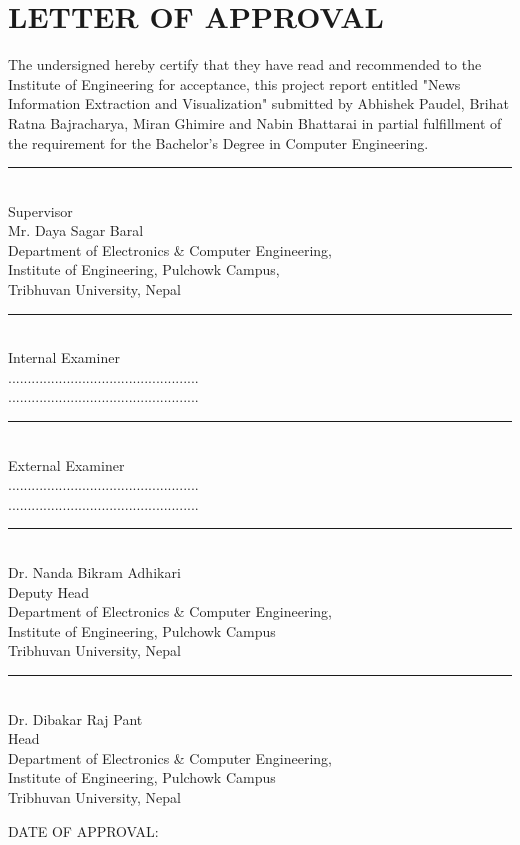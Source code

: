 
\newpage
\section*{LETTER OF APPROVAL}
\setcounter{page}{2}
The undersigned hereby certify that they have read and recommended to the Institute of Engineering for acceptance, this project
report entitled "News Information Extraction and Visualization" submitted by Abhishek Paudel, Brihat Ratna Bajracharya, Miran Ghimire and Nabin Bhattarai in partial fulfillment of the requirement for the Bachelor's Degree in Computer Engineering.

\vfill
\begin{minipage}{.60\textwidth}
\rule{1\textwidth}{1pt}\\
Supervisor \\
Mr. Daya Sagar Baral \\
{Department of Electronics \& Computer Engineering,} \\
Institute of Engineering, Pulchowk Campus, \\
Tribhuvan University, Nepal
\end{minipage}

\vfill
\begin{minipage}{.5\textwidth}
\rule{.66\textwidth}{0.8pt} \\
Internal Examiner \\
................................................. \\
.................................................
\end{minipage}
\begin{minipage}{.5\textwidth}
\rule{.66\textwidth}{0.8pt} \\
External Examiner \\
................................................. \\
.................................................
\end{minipage}
\vfill
\begin{minipage}{.53\textwidth}
\rule{.6\textwidth}{0.8pt}\\
Dr. Nanda Bikram Adhikari \\
Deputy Head  \\
    {\small Department of Electronics \& Computer Engineering,} \\
Institute of Engineering, Pulchowk Campus \\
Tribhuvan University, Nepal \\
\end{minipage}
\begin{minipage}{.53\textwidth}
\rule{.6\textwidth}{0.8pt}\\
Dr. Dibakar Raj Pant \\
Head  \\
    {\small Department of Electronics \& Computer Engineering,} \\
Institute of Engineering, Pulchowk Campus \\
Tribhuvan University, Nepal \\
\end{minipage}

\vfill
DATE OF APPROVAL:
\vfill
